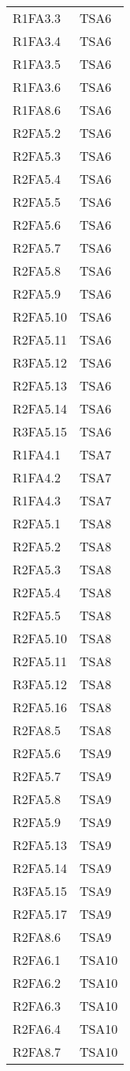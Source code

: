 {\begin{longtable}{C{4cm} C{4cm}}
R1FA3.3 & TSA6  \\
R1FA3.4 & TSA6  \\
R1FA3.5 & TSA6  \\
R1FA3.6 & TSA6  \\
R1FA8.6 & TSA6  \\
R2FA5.2 & TSA6  \\
R2FA5.3 & TSA6  \\
R2FA5.4 & TSA6  \\
R2FA5.5 & TSA6  \\
R2FA5.6 & TSA6  \\
R2FA5.7 & TSA6  \\
R2FA5.8 & TSA6  \\
R2FA5.9 & TSA6  \\
R2FA5.10 & TSA6  \\
R2FA5.11 & TSA6  \\
R3FA5.12 & TSA6  \\
R2FA5.13 & TSA6  \\
R2FA5.14 & TSA6  \\
R3FA5.15 & TSA6  \\

R1FA4.1 & TSA7  \\
R1FA4.2& TSA7  \\
R1FA4.3& TSA7  \\

R2FA5.1 & TSA8  \\
R2FA5.2 & TSA8  \\
R2FA5.3 & TSA8  \\
R2FA5.4 & TSA8  \\
R2FA5.5 & TSA8  \\
R2FA5.10 & TSA8  \\
R2FA5.11 & TSA8  \\
R3FA5.12 & TSA8  \\
R2FA5.16 & TSA8  \\
R2FA8.5 & TSA8  \\

R2FA5.6 & TSA9  \\
R2FA5.7 & TSA9  \\
R2FA5.8 & TSA9  \\
R2FA5.9 & TSA9  \\
R2FA5.13 & TSA9  \\
R2FA5.14 & TSA9  \\
R3FA5.15 & TSA9  \\
R2FA5.17 & TSA9  \\
R2FA8.6 & TSA9  \\

R2FA6.1 & TSA10  \\
R2FA6.2 & TSA10  \\
R2FA6.3 & TSA10  \\
R2FA6.4 & TSA10  \\
R2FA8.7 & TSA10  \\


\end{longtable}}
